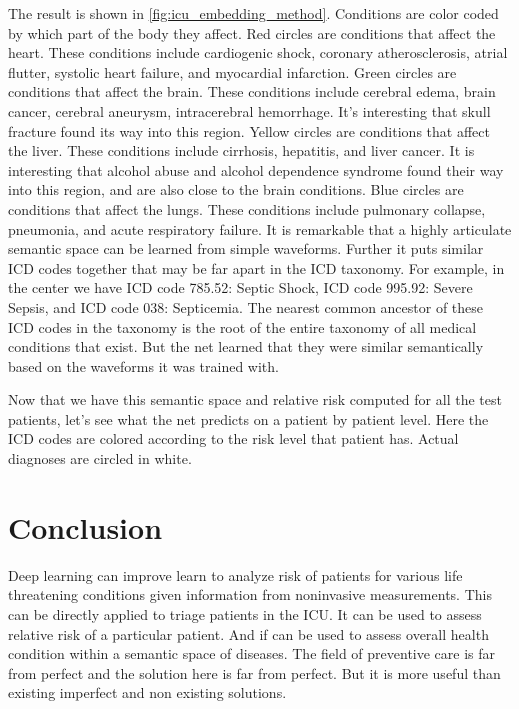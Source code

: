 \figIcuEmbeddingMethod

The result is shown in \ref{fig:icu_embedding_method}. Conditions are color coded by which part of the body they affect.  Red circles are conditions that affect the heart.  These conditions include cardiogenic shock, coronary atherosclerosis, atrial flutter, systolic heart failure, and myocardial infarction.  Green circles are conditions that affect the brain.  These conditions include cerebral edema, brain cancer, cerebral aneurysm, intracerebral hemorrhage.  It’s interesting that skull fracture found its way into this region.  Yellow circles are conditions that affect the liver.  These conditions include cirrhosis, hepatitis, and liver cancer.  It is interesting that alcohol abuse and alcohol dependence syndrome found their way into this region, and are also close to the brain conditions.  Blue circles are conditions that affect the lungs.  These conditions include pulmonary collapse, pneumonia, and acute respiratory failure.  It is remarkable that a highly articulate semantic space can be learned from simple waveforms.  Further it puts similar ICD codes together that may be far apart in the ICD taxonomy.  For example, in the center we have ICD code 785.52: Septic Shock, ICD code 995.92: Severe Sepsis, and ICD code 038: Septicemia.  The nearest common ancestor of these ICD codes in the taxonomy is the root of the entire taxonomy of all medical conditions that exist.  But the net learned that they were similar semantically based on the waveforms it was trained with.

\figIcuIcdMap

Now that we have this semantic space and relative risk computed for all the test patients, let's see what the net predicts on a patient by patient level.  Here the ICD codes are colored according to the risk level that patient has.  Actual diagnoses are circled in white.


\section{Conclusion}
Deep learning can improve learn to analyze risk of patients for various life threatening conditions given information from noninvasive measurements.  This can be directly applied to triage patients in the ICU.  It can be used to assess relative risk of a particular patient.  And if can be used to assess overall health condition within a semantic space of diseases.  The field of preventive care is far from perfect and the solution here is far from perfect.  But it is more useful than existing imperfect and non existing solutions.